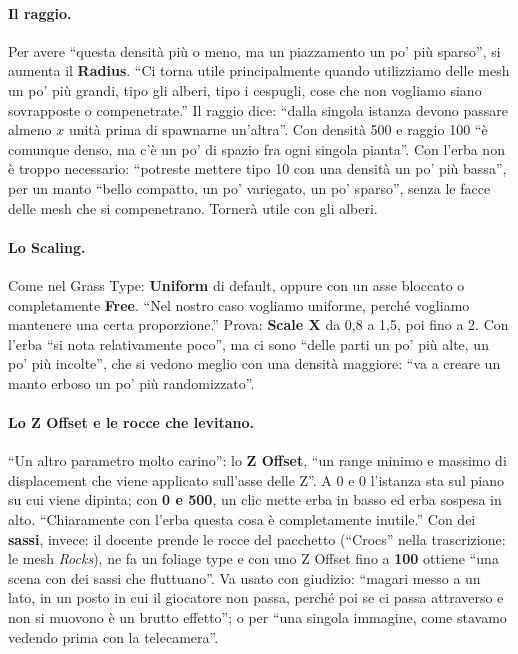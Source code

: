\paragraph{Il raggio.} Per avere ``questa densità più o meno, ma un piazzamento un po' più
sparso'', si aumenta il \textbf{Radius}. ``Ci torna utile principalmente quando utilizziamo
delle mesh un po' più grandi, tipo gli alberi, tipo i cespugli, cose che non vogliamo siano
sovrapposte o compenetrate.'' Il raggio dice: ``dalla singola istanza devono passare almeno
$x$ unità prima di spawnarne un'altra''. Con densità 500 e raggio 100 ``è comunque denso, ma
c'è un po' di spazio fra ogni singola pianta''. Con l'erba non è troppo necessario: ``potreste
mettere tipo 10 con una densità un po' più bassa'', per un manto ``bello compatto, un po'
variegato, un po' sparso'', senza le facce delle mesh che si compenetrano. Tornerà utile con
gli alberi.

\paragraph{Lo Scaling.} Come nel Grass Type: \textbf{Uniform} di default, oppure con un asse
bloccato o completamente \textbf{Free}. ``Nel nostro caso vogliamo uniforme, perché vogliamo
mantenere una certa proporzione.'' Prova: \textbf{Scale X} da 0,8 a 1,5, poi fino a 2. Con
l'erba ``si nota relativamente poco'', ma ci sono ``delle parti un po' più alte, un po' più
incolte'', che si vedono meglio con una densità maggiore: ``va a creare un manto erboso un po'
più randomizzato''.

\paragraph{Lo Z Offset e le rocce che levitano.} ``Un altro parametro molto carino'':
lo \textbf{Z Offset}, ``un range minimo e massimo di displacement che viene applicato sull'asse
delle Z''. A 0 e 0 l'istanza sta sul piano su cui viene dipinta; con \textbf{0 e 500}, un clic
mette erba in basso ed erba sospesa in alto. ``Chiaramente con l'erba questa cosa è
completamente inutile.'' Con dei \textbf{sassi}, invece: il docente prende le rocce del
pacchetto (``Crocs'' nella trascrizione: le mesh \emph{Rocks}), ne fa un foliage type e
con uno Z Offset fino a \textbf{100} ottiene ``una scena con dei sassi che fluttuano''. Va
usato con giudizio: ``magari messo a un lato, in un posto in cui il giocatore non passa,
perché poi se ci passa attraverso e non si muovono è un brutto effetto''; o per ``una singola
immagine, come stavamo vedendo prima con la telecamera''.

